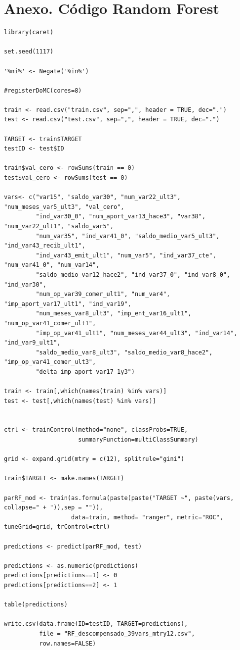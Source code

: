 \documentclass[11pt,a4paper,spanish]{article} %
\begin{document}
\section{Anexo. Código Random Forest}
{\scriptsize
\begin{verbatim}
library(caret)

set.seed(1117)

'%ni%' <- Negate('%in%') 

#registerDoMC(cores=8)

train <- read.csv("train.csv", sep=",", header = TRUE, dec=".")
test <- read.csv("test.csv", sep=",", header = TRUE, dec=".")

TARGET <- train$TARGET
testID <- test$ID

train$val_cero <- rowSums(train == 0)
test$val_cero <- rowSums(test == 0)

vars<- c("var15", "saldo_var30", "num_var22_ult3", "num_meses_var5_ult3", "val_cero", 
         "ind_var30_0", "num_aport_var13_hace3", "var38", "num_var22_ult1", "saldo_var5",
         "num_var35", "ind_var41_0", "saldo_medio_var5_ult3", "ind_var43_recib_ult1", 
         "ind_var43_emit_ult1", "num_var5", "ind_var37_cte", "num_var41_0", "num_var14",
         "saldo_medio_var12_hace2", "ind_var37_0", "ind_var8_0", "ind_var30", 
         "num_op_var39_comer_ult1", "num_var4", "imp_aport_var17_ult1", "ind_var19",
         "num_meses_var8_ult3", "imp_ent_var16_ult1", "num_op_var41_comer_ult1", 
         "imp_op_var41_ult1", "num_meses_var44_ult3", "ind_var14",  "ind_var9_ult1", 
         "saldo_medio_var8_ult3", "saldo_medio_var8_hace2", "imp_op_var41_comer_ult3", 
         "delta_imp_aport_var17_1y3")  

train <- train[,which(names(train) %in% vars)]
test <- test[,which(names(test) %in% vars)]


ctrl <- trainControl(method="none", classProbs=TRUE,
                     summaryFunction=multiClassSummary)

grid <- expand.grid(mtry = c(12), splitrule="gini")

train$TARGET <- make.names(TARGET)

parRF_mod <- train(as.formula(paste(paste("TARGET ~", paste(vars, collapse=" + ")),sep = "")), 
				   data=train, method= "ranger", metric="ROC", tuneGrid=grid, trControl=ctrl)

predictions <- predict(parRF_mod, test)

predictions <- as.numeric(predictions)
predictions[predictions==1] <- 0
predictions[predictions==2] <- 1

table(predictions)

write.csv(data.frame(ID=testID, TARGET=predictions), 
          file = "RF_descompensado_39vars_mtry12.csv",
          row.names=FALSE)
\end{verbatim}
}
\end{document}
